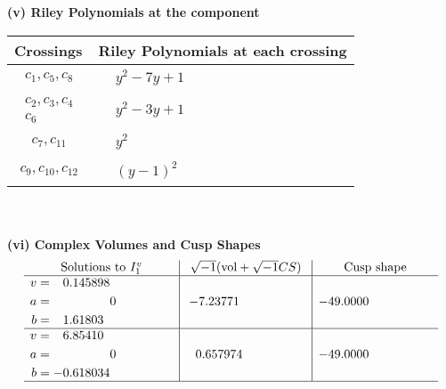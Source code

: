 \documentclass[1p]{elsarticle_modified}
\theoremstyle{definition}
\newcommand{\I}{\sqrt{-1}}
\begin{document}
\newpage\renewcommand{\arraystretch}{1}
\flushleft \textbf{(v) Riley Polynomials at the component}\newline \\
\begin{tabular}{m{50pt}|m{274pt}}
Crossings & \hspace{64pt}Riley Polynomials at each crossing \\
\hline $$\begin{aligned}c_{1},c_{5},c_{8}\end{aligned}$$&$\begin{aligned}
&y^2-7 y+1
\end{aligned}$\\
\hline $$\begin{aligned}c_{2},c_{3},c_{4}\\c_{6}\end{aligned}$$&$\begin{aligned}
&y^2-3 y+1
\end{aligned}$\\
\hline $$\begin{aligned}c_{7},c_{11}\end{aligned}$$&$\begin{aligned}
&y^2
\end{aligned}$\\
\hline $$\begin{aligned}c_{9},c_{10},c_{12}\end{aligned}$$&$\begin{aligned}
&(y-1)^2
\end{aligned}$\\
\hline
\end{tabular}\\~\\
\newpage\flushleft \textbf{(vi) Complex Volumes and Cusp Shapes}
$$\begin{array}{c|c|c}  
\text{Solutions to }I^v_{1}& \I (\text{vol} + \sqrt{-1}CS) & \text{Cusp shape}\\
 \hline 
\begin{aligned}
v &= \phantom{-}0.145898\phantom{ +0.000000I} \\
a &= \phantom{-0.000000 } 0 \\
b &= \phantom{-}1.61803\phantom{ +0.000000I}\end{aligned}
 & -7.23771\phantom{ +0.000000I} & -49.0000\phantom{ +0.000000I} \\ \hline\begin{aligned}
v &= \phantom{-}6.85410\phantom{ +0.000000I} \\
a &= \phantom{-0.000000 } 0 \\
b &= -0.618034\phantom{ +0.000000I}\end{aligned}
 & \phantom{-}0.657974\phantom{ +0.000000I} & -49.0000\phantom{ +0.000000I}\\
 \hline 
 \end{array}$$\newpage
\end{document}
